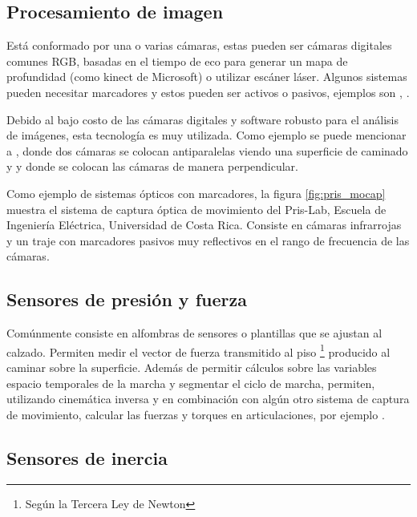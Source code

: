 \subsection{Procesamiento de imagen}

Está conformado por una o varias cámaras, estas pueden ser cámaras digitales comunes RGB, basadas en el tiempo de eco para generar un mapa de profundidad (como kinect de Microsoft) o utilizar escáner láser. Algunos sistemas pueden necesitar marcadores y estos pueden ser activos o pasivos, ejemplos son \cite{prakash}, \cite{yang2}. \citep{muro}

Debido al bajo costo de las cámaras digitales y software robusto para el análisis de imágenes, esta tecnología es muy utilizada. Como ejemplo se puede mencionar a \cite{hoang}, donde dos cámaras se colocan antiparalelas viendo una superficie de caminado y \cite{li} y \cite{mrozowski} donde se colocan las cámaras de manera perpendicular. 

Como ejemplo de sistemas ópticos con marcadores, la figura \ref{fig:pris_mocap} muestra el sistema de captura óptica de movimiento  del Pris-Lab, Escuela de Ingeniería Eléctrica, Universidad de Costa Rica. Consiste en cámaras infrarrojas y un traje con marcadores pasivos muy reflectivos en el rango de frecuencia de las cámaras. 


\subsection{Sensores de presión y fuerza}

Comúnmente consiste en alfombras de sensores o plantillas que se ajustan al calzado. Permiten medir el vector de fuerza transmitido al piso \footnote{Según la Tercera Ley de Newton} producido al caminar sobre la superficie. Además de permitir cálculos sobre las variables espacio temporales de la marcha y segmentar el ciclo de marcha, permiten, utilizando cinemática inversa y en combinación con algún otro sistema de captura de movimiento, calcular las fuerzas y torques en articulaciones, por ejemplo \cite{mizoguchi}.

\subsection{Sensores de inercia}

